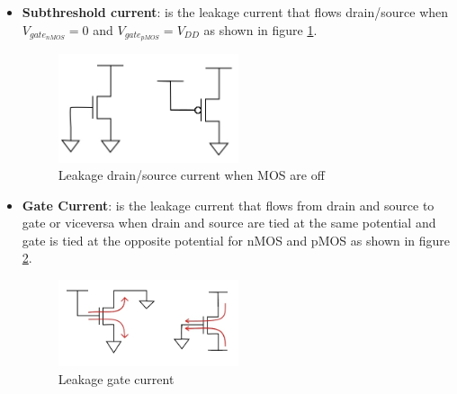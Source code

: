 \begin{itemize}
\item \textbf{Subthreshold current}: is the leakage current that flows drain/source when $V_{gate_{nMOS}}=0$ and $V_{gate_{pMOS}}=V_{DD}$ as shown in figure \ref{fig:ds_leakage}.
\begin{figure}[htbp]
\begin{center}
\includegraphics[width=0.5\textwidth]{img/mos_off.png}
\caption{Leakage drain/source current when MOS are off}
\label{fig:ds_leakage}
\end{center}
\end{figure}

\item \textbf{Gate Current}: is the leakage current that flows from drain and source to gate or viceversa when drain and source are tied at the same potential and gate is tied at the opposite potential for nMOS and pMOS as shown in figure \ref{fig:gate_leakage}.
\begin{figure}[htbp]
\begin{center}
\includegraphics[width=0.5\textwidth]{img/mos_gate.jpg}
\caption{Leakage gate current}
\label{fig:gate_leakage}
\end{center}
\end{figure}

\end{itemize}

